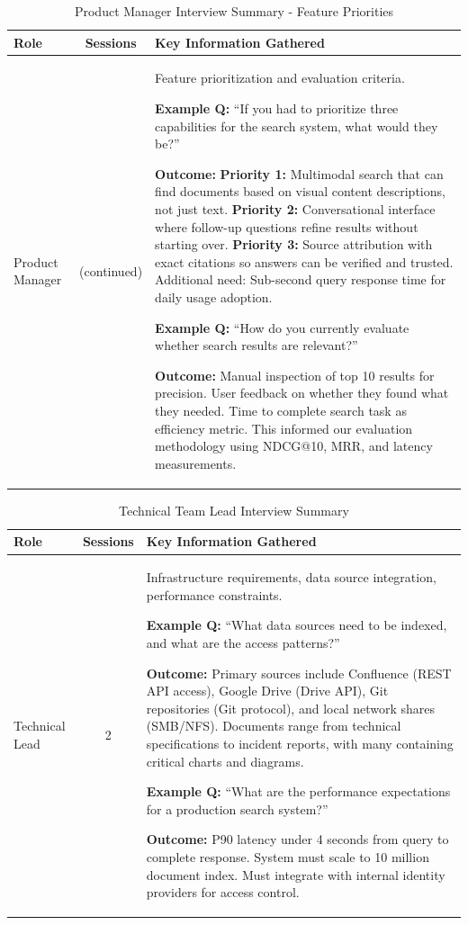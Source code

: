 \documentclass{report}
\begin{document}
\begin{table}[H]
\centering
\caption{Product Manager Interview Summary - Feature Priorities}
\label{tab:pm_priorities}
\begin{tabularx}{\textwidth}{|l|c|X|}
\hline
\textbf{Role} & \textbf{Sessions} & \textbf{Key Information Gathered} \\ 
\hline
Product Manager & (continued) & Feature prioritization and evaluation criteria.

\textbf{Example Q:} ``If you had to prioritize three capabilities for the search system, what would they be?''

\textbf{Outcome:} \textbf{Priority 1:} Multimodal search that can find documents based on visual content descriptions, not just text. \textbf{Priority 2:} Conversational interface where follow-up questions refine results without starting over. \textbf{Priority 3:} Source attribution with exact citations so answers can be verified and trusted. Additional need: Sub-second query response time for daily usage adoption.

\textbf{Example Q:} ``How do you currently evaluate whether search results are relevant?''

\textbf{Outcome:} Manual inspection of top 10 results for precision. User feedback on whether they found what they needed. Time to complete search task as efficiency metric. This informed our evaluation methodology using NDCG@10, MRR, and latency measurements. \\
\hline
\end{tabularx}
\end{table}

\begin{table}[H]
\centering
\caption{Technical Team Lead Interview Summary}
\label{tab:tech_interview}
\begin{tabularx}{\textwidth}{|l|c|X|}
\hline
\textbf{Role} & \textbf{Sessions} & \textbf{Key Information Gathered} \\ 
\hline
Technical Lead & 2 & Infrastructure requirements, data source integration, performance constraints.

\textbf{Example Q:} ``What data sources need to be indexed, and what are the access patterns?''

\textbf{Outcome:} Primary sources include Confluence (REST API access), Google Drive (Drive API), Git repositories (Git protocol), and local network shares (SMB/NFS). Documents range from technical specifications to incident reports, with many containing critical charts and diagrams.

\textbf{Example Q:} ``What are the performance expectations for a production search system?''

\textbf{Outcome:} P90 latency under 4 seconds from query to complete response. System must scale to 10 million document index. Must integrate with internal identity providers for access control. \\
\hline
\end{tabularx}
\end{table}
\end{document}
